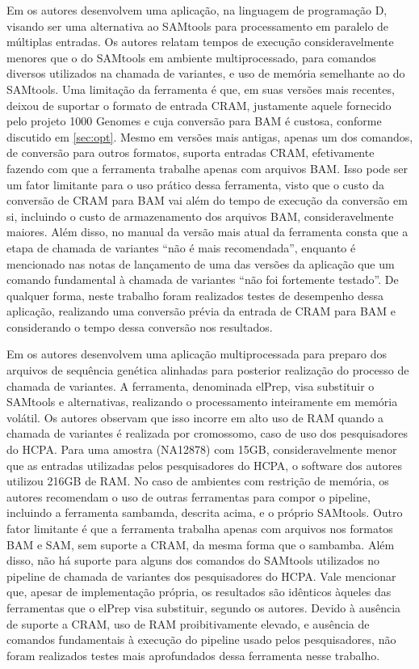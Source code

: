 \documentclass[cic,tc]{iiufrgs}
\begin{document}
Em \cite{tarasov2015sambamba} os autores desenvolvem uma aplicação, na
linguagem de programação D, visando ser uma alternativa ao SAMtools para
processamento em paralelo de múltiplas entradas. Os autores relatam tempos de
execução consideravelmente menores que o do SAMtools em ambiente
multiprocessado, para comandos diversos utilizados na chamada de variantes, e
uso de memória semelhante ao do SAMtools. Uma limitação da ferramenta é que, em
suas versões mais recentes, deixou de suportar o formato de entrada CRAM,
justamente aquele fornecido pelo projeto 1000 Genomes e cuja conversão para BAM é
custosa, conforme discutido em \ref{sec:opt}. Mesmo em versões mais antigas,
apenas um dos comandos, de conversão para outros formatos, suporta entradas
CRAM, efetivamente fazendo com que a ferramenta trabalhe apenas com arquivos
BAM. Isso pode ser um fator limitante para o uso prático dessa ferramenta,
visto que o custo da conversão de CRAM para BAM vai além do tempo de execução
da conversão em si, incluindo o custo de armazenamento dos arquivos BAM,
consideravelmente maiores. Além disso, no manual da versão mais atual da
ferramenta consta que a etapa de chamada de variantes ``não é mais
recomendada'', enquanto é mencionado nas notas de lançamento de uma das versões
da aplicação que um comando fundamental à chamada de variantes ``não
foi fortemente testado''.\cite{manual2015sambamba} De qualquer forma, neste
trabalho foram realizados testes de desempenho dessa aplicação, realizando uma
conversão prévia da entrada de CRAM para BAM e considerando o tempo dessa
conversão nos resultados.

Em \cite{herzeel2015elprep} os autores desenvolvem uma aplicação
multiprocessada para preparo dos arquivos de sequência genética alinhadas para
posterior realização do processo de chamada de variantes. A ferramenta,
denominada elPrep, visa substituir o SAMtools e alternativas, realizando o
processamento inteiramente em memória volátil. Os autores observam que isso
incorre em alto uso de RAM quando a chamada de variantes é realizada por
cromossomo, caso de uso dos pesquisadores do HCPA. Para uma amostra (NA12878)
com 15GB, consideravelmente menor que as entradas utilizadas pelos
pesquisadores do HCPA, o software dos autores utilizou 216GB de RAM. No caso de
ambientes com restrição de memória, os autores recomendam o uso de outras
ferramentas para compor o pipeline, incluindo a ferramenta sambamda, descrita
acima, e o próprio SAMtools. Outro fator limitante é que a ferramenta trabalha
apenas com arquivos nos formatos BAM e SAM, sem suporte a CRAM, da mesma forma
que o sambamba. Além disso, não há suporte para alguns dos comandos do
SAMtools utilizados no pipeline de chamada de variantes dos pesquisadores do
HCPA. Vale mencionar que, apesar de implementação própria, os resultados são
idênticos àqueles das ferramentas que o elPrep visa substituir, segundo os
autores. Devido à ausência de suporte a CRAM, uso de RAM proibitivamente
elevado, e ausência de comandos fundamentais à execução do pipeline usado pelos
pesquisadores, não foram realizados testes mais aprofundados dessa ferramenta
nesse trabalho.
\end{document}
